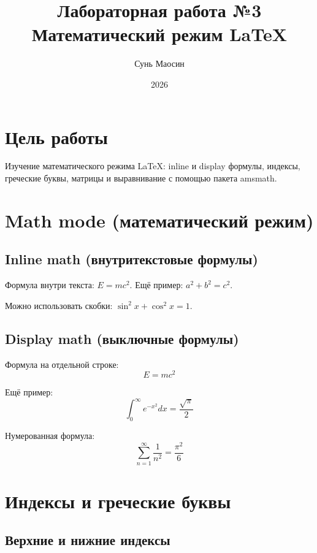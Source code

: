 \documentclass[a4paper,12pt]{article}
\begin{document}
\title{Лабораторная работа №3 \\ Математический режим LaTeX}
\author{Сунь Маосин}
\date{2026}
\maketitle

\section{Цель работы}

Изучение математического режима LaTeX: inline и display формулы, индексы, греческие буквы, матрицы и выравнивание с помощью пакета amsmath.

\section{Math mode (математический режим)}

\subsection{Inline math (внутритекстовые формулы)}

Формула внутри текста: $E = mc^2$. 
Ещё пример: $a^2 + b^2 = c^2$.

Можно использовать скобки: \( \sin^2 x + \cos^2 x = 1 \).

\subsection{Display math (выключные формулы)}

Формула на отдельной строке:
\[
E = mc^2
\]

Ещё пример:
\[
\int_{0}^{\infty} e^{-x^2} dx = \frac{\sqrt{\pi}}{2}
\]

Нумерованная формула:
\begin{equation}
\sum_{n=1}^{\infty} \frac{1}{n^2} = \frac{\pi^2}{6}
\end{equation}

\section{Индексы и греческие буквы}

\subsection{Верхние и нижние индексы}
\end{document}
